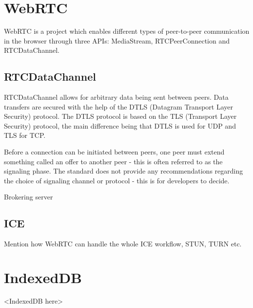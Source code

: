 \section{WebRTC}

WebRTC is a project which enables different types of peer-to-peer communication in the browser through three APIs: MediaStream, RTCPeerConnection and RTCDataChannel.

\subsection{RTCDataChannel}
RTCDataChannel allows for arbitrary data being sent between peers. Data transfers are secured with the help of the DTLS (Datagram Transport Layer Security) protocol. The DTLS protocol is based on the TLS (Transport Layer Security) protocol, the main difference being that DTLS is used for UDP and TLS for TCP.

Before a connection can be initiated between peers, one peer must extend something called an offer to another peer - this is often referred to as the signaling phase. The standard does not provide any recommendations regarding the choice of signaling channel or protocol - this is for developers to decide.

Brokering server

\subsection{ICE}
Mention how WebRTC can handle the whole ICE workflow, STUN, TURN etc.

\section{IndexedDB}

<IndexedDB here>
